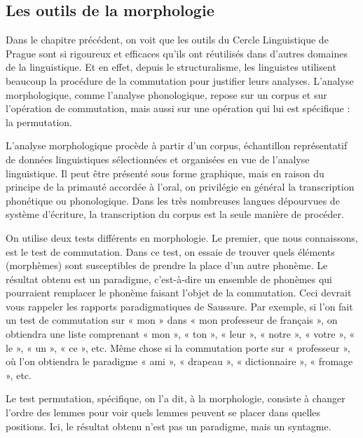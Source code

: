 \subsection{Les outils de la morphologie}
Dans le chapitre précédent, on voit que les outils du Cercle Linguistique de Prague sont si rigoureux et efficaces qu’ils ont réutilisés dans d’autres domaines de la linguistique. Et en effet, depuis le structuralisme, les linguistes utilisent beaucoup la procédure de la commutation pour justifier leurs analyses. L’analyse morphologique, comme l’analyse phonologique, repose sur un corpus et sur l’opération de commutation, mais aussi sur une opération qui lui est spécifique : la permutation.

L’analyse morphologique procède à partir d’un corpus, échantillon représentatif de données linguistiques sélectionnées et organisées en vue de l’analyse linguistique. Il peut être présenté sous forme graphique, mais en raison du principe de la primauté accordée à l’oral, on privilégie en général la transcription phonétique ou phonologique. Dans les très nombreuses langues dépourvues de système d’écriture, la transcription du corpus est la seule manière de procéder.

On utilise deux tests différents en morphologie. Le premier, que nous connaissons, est le test de commutation. Dans ce test, on essaie de trouver quels éléments (morphèmes) sont susceptibles de prendre la place d’un autre phonème. Le résultat obtenu est un paradigme, c’est-à-dire un ensemble de phonèmes qui pourraient remplacer le phonème faisant l’objet de la commutation. Ceci devrait vous rappeler les rapports paradigmatiques de Saussure. Par exemple, si l’on fait un test de commutation sur « mon » dans « mon professeur de français », on obtiendra une liste comprenant « mon », « ton », « leur », « notre », « votre », « le », « un », « ce », etc. Même chose si la commutation porte sur « professeur », où l’on obtiendra le paradigme « ami », « drapeau », « dictionnaire », « fromage », etc.

Le test permutation, spécifique, on l’a dit, à la morphologie, consiste à changer l’ordre des lemmes pour voir quels lemmes peuvent se placer dans quelles positions. Ici, le résultat obtenu n’est pas un paradigme, mais un syntagme.

